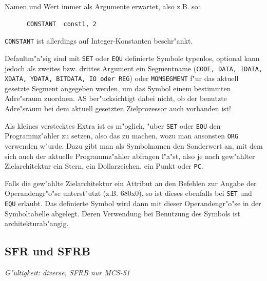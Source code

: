 \documentclass[12pt,a4paper,twoside]{report}
\makeatletter
\newcommand{\tty}[1]{{\tt #1}}
\newcommand{\ttindex}[1]{\index{#1@{\tt #1}}}
\newcommand{\asname}{AS}
\makeatother
\begin{document}
Namen und Wert immer als Argumente erwartet, also z.B. so:
\begin{verbatim}
      CONSTANT  const1, 2
\end{verbatim}
{\tt CONSTANT} ist allerdings auf Integer-Konstanten beschr"ankt.
\par
Defaultm"a"sig sind mit \tty{SET} oder \tty{EQU} definierte Symbole
typenlos, optional kann jedoch als zweites bzw. drittes Argument ein
Segmentname (\tty{CODE, DATA, IDATA, XDATA, YDATA, BITDATA, IO oder REG})
oder \tty{MOMSEGMENT} f"ur das aktuell gesetzte Segment angegeben werden,
um das Symbol einem bestimmten Adre"sraum zuordnen.  \asname{} ber"ucksichtigt
dabei nicht, ob der benutzte Adre"sraum bei dem aktuell gesetzten
Zielprozessor auch vorhanden ist!

Als kleines verstecktes Extra ist es m"oglich, "uber \tty{SET} oder \tty{EQU}
den Programmz"ahler zu setzen, also das zu machen, wozu man ansonsten \tty{ORG}
verwenden w"urde.  Dazu gibt man als Symbolnamen den Sonderwert an, mit dem
sich auch der aktuelle Programmz"ahler abfragen l"a"st, also je nach
gew"ahlter Zielarchitektur ein Stern, ein Dollarzeichen, ein Punkt oder \tty{PC}.

Falls die gew"ahlte Zielarchitektur ein Attribut an den Befehlen zur Angabe
der Operandengr"o"se unterst"utzt (z.B. 680x0), so ist dieses ebenfalls
bei \tty{SET} und \tty{EQU} erlaubt.  Das definierte Symbol wird dann mit
dieser Operandengr"o"se in der Symboltabelle abgelegt.  Deren Verwendung
bei Benutzung des Symbols ist architekturab"angig.


\subsection{SFR und SFRB}
\ttindex{SFR}\ttindex{SFRB}

{\em G"ultigkeit: diverse, SFRB nur MCS-51}
\end{document}
